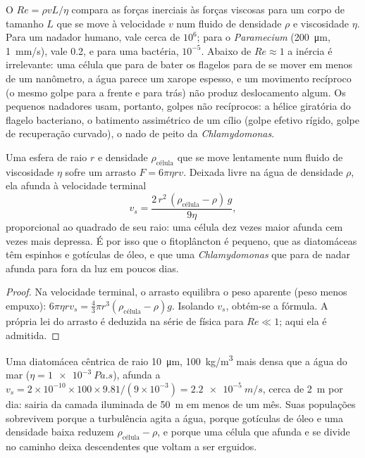 \begin{proposition}\label{prop:b2:unicellular-diversity:reynolds}
O \emph{} $Re = \rho v L/\eta$ compara as forças
inerciais às forças viscosas para um corpo de tamanho $L$ que se move
à velocidade $v$ num fluido de densidade $\rho$ e viscosidade $\eta$.
Para um nadador humano, vale cerca de $10^6$; para o
\emph{Paramecium} (\qty{200}{\micro m}, \qty{1}{mm/s}), vale 0.2, e
para uma bactéria, $10^{-5}$. Abaixo de
$Re \approx 1$ a inércia é irrelevante: uma célula que para de bater
os flagelos para de se mover em menos de um nanômetro, a água parece
um xarope espesso, e um movimento recíproco (o mesmo golpe para a
frente e para trás) não produz deslocamento algum. Os pequenos
nadadores usam, portanto, golpes não recíprocos: a hélice giratória
do flagelo bacteriano, o batimento assimétrico de um cílio (golpe
efetivo rígido, golpe de recuperação curvado), o nado de peito da
\emph{Chlamydomonas}.
\end{proposition}

\begin{theorem}\label{thm:b2:unicellular-diversity:stokes}
Uma esfera de raio $r$ e densidade $\rho_{\text{célula}}$ que se move
lentamente num fluido de viscosidade $\eta$ sofre um arrasto
$F = 6\pi\eta r v$. Deixada livre na água de densidade $\rho$, ela
afunda à velocidade terminal
\[
v_s = \frac{2\,r^2\,(\rho_{\text{célula}} - \rho)\,g}{9\eta},
\]
proporcional ao quadrado de seu raio: uma célula dez vezes maior
afunda cem vezes mais depressa. É por isso que o fitoplâncton é
pequeno, que as diatomáceas têm espinhos e gotículas de óleo, e que uma
\emph{Chlamydomonas} que para de nadar afunda para fora da luz em
poucos dias.
\end{theorem}
\begin{proof}
Na velocidade terminal, o arrasto equilibra o peso aparente (peso
menos empuxo): $6\pi\eta r v_s = \tfrac{4}{3}\pi r^3
(\rho_{\text{célula}} - \rho) g$. Isolando $v_s$, obtém-se a fórmula.
A própria lei do arrasto é deduzida na série de física para
$Re \ll 1$; aqui ela é admitida.
\end{proof}

\begin{example}\label{ex:b2:unicellular-diversity:fall}
Uma diatomácea cêntrica de raio \qty{10}{\micro m}, \qty{100}{kg/m^3}
mais densa que a água do mar ($\eta = \qty{1e-3}{Pa.s}$), afunda a
$v_s = 2\times 10^{-10}\times 100\times 9.81/(9\times 10^{-3}) =
\qty{2.2e-5}{m/s}$, cerca de \qty{2}{m} por dia: sairia da camada
iluminada de \qty{50}{m} em menos de um mês. Suas populações
sobrevivem porque a turbulência agita a água, porque gotículas de óleo
e uma densidade baixa reduzem $\rho_{\text{célula}} - \rho$, e porque
uma célula que afunda e se divide no caminho deixa descendentes que
voltam a ser erguidos.
\end{example}

